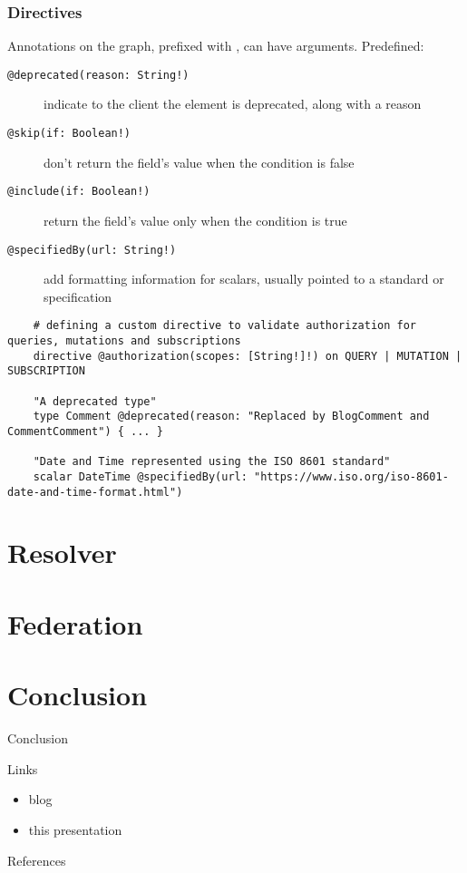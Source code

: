 \documentclass[notes]{beamer}
\begin{document}
\begin{frame}[fragile]
  \frametitle{Directives}
  Annotations on the graph, prefixed with \@, can have arguments. Predefined:
  \begin{description}
  \item[\texttt{@deprecated(reason: String!)}] indicate to the client the element is deprecated, along with a reason
  \item[\texttt{@skip(if: Boolean!)}] don't return the field's value when the condition is false
  \item[\texttt{@include(if: Boolean!)}] return the field's value only when the condition is true
  \item[\texttt{@specifiedBy(url: String!)}] add formatting information for scalars, usually pointed to a standard or specification
  \end{description}

  \begin{verbatim}
    # defining a custom directive to validate authorization for queries, mutations and subscriptions
    directive @authorization(scopes: [String!]!) on QUERY | MUTATION | SUBSCRIPTION
    
    "A deprecated type"
    type Comment @deprecated(reason: "Replaced by BlogComment and CommentComment") { ... }

    "Date and Time represented using the ISO 8601 standard"
    scalar DateTime @specifiedBy(url: "https://www.iso.org/iso-8601-date-and-time-format.html")
  \end{verbatim}
\end{frame}


\section{Resolver}
\section{Federation}
\section{Conclusion}
\begin{frame}{Conclusion}
\end{frame}

\begin{frame}{Links}
  \begin{itemize}
  \item blog
  \item this presentation
  \end{itemize}
\end{frame}

\begin{frame}{References}
  \printbibliography{}
\end{frame}
\end{document}
